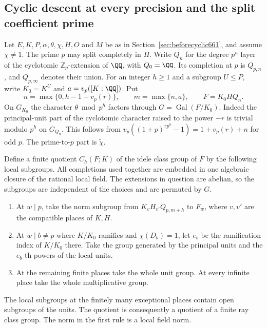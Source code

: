 \documentclass[a4paper,11pt]{article}
\theoremstyle{definition}
\theoremstyle{remark}
\newcommand{\ZZ}{\mathbb Z}\newcommand{\ord}{\operatorname{ord}}
\numberwithin{equation}{section}
\begin{document}
\subsection{Cyclic descent at every precision and the split coefficient prime}
\label{sec:cycpres663}

Let \(E,K,P,\alpha,\theta,\chi,H,O\) and \(M\) be as in
Section~\ref{sec:beforecyclic661}, and assume \(\chi\ne1\).
The prime \(p\) may split completely in \(H\). Write \(Q_n\)
for the degree \(p^n\) layer of the cyclotomic \(\ZZ_p\)-extension
of \(\QQ\), with \(Q_0=\QQ\). Its completion at \(p\) is \(Q_{p,n}\),
and \(Q_{p,\infty}\) denotes their union. For an integer \(h\ge1\)
and a subgroup \(U\le P\), write \(K_0=K^U\) and
\(a=v_p([K:\QQ])\). Put
\[
 n=\max\{0,h-1-v_p(r)\},\qquad m=\max\{n,a\},\qquad
 F=K_0 H Q_n .
\]
On \(G_{K_0}\) the character \(\theta\bmod p^h\) factors through
\(G=\operatorname{Gal}(F/K_0)\). Indeed the principal-unit part
of the cyclotomic character raised to the power \(-r\) is
trivial modulo \(p^h\) on \(G_{Q_n}\). This follows from
\(v_p((1+p)^{r p^n}-1)=1+v_p(r)+n\) for odd \(p\).
The prime-to-\(p\) part is \(\widetilde\chi\).

Define a finite quotient \(C_h(F;K)\) of the idele class group
of \(F\) by the following local subgroups. All completions used
together are embedded in one algebraic closure of the rational
local field. The extensions in question are abelian, so the
subgroups are independent of the choices and are permuted by \(G\).
\begin{enumerate}
\item At \(w\mid p\), take the norm subgroup from
\(K_v H_{v'} Q_{p,m+h}\) to \(F_w\), where \(v,v'\) are the
compatible places of \(K,H\).
\item At \(w\mid b\ne p\) where \(K/K_0\) ramifies and
\(\chi(D_b)=1\), let \(e_b\) be the ramification index of
\(K/K_0\) there. Take the group generated by the principal
units and the \(e_b\)-th powers of the local units.
\item At the remaining finite places take the whole unit group.
At every infinite place take the whole multiplicative group.
\end{enumerate}
The local subgroups at the finitely many exceptional places
contain open subgroups of the units. The quotient is consequently
a quotient of a finite ray class group. The norm in the first
rule is a local field norm.
\end{document}
